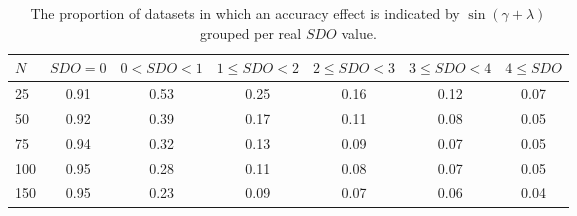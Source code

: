 \documentclass[11pt,]{article}
\begin{document}
\begin{appendices}
\begin{table}[ht]
\centering
\caption{The proportion of datasets in which an accuracy effect is indicated by $\sin(\gamma+ \lambda)$ grouped per real $SDO$ value.} 
\begin{tabular}{lcccccc}
  \noalign{\smallskip}\hline\noalign{\smallskip}
$N$ & $SDO = 0$ & $ 0 < SDO < 1$ & $1 \leq SDO < 2$ & $2 \leq SDO < 3$ &  $3 \leq SDO < 4$ & $4 \leq SDO$\\ \hline\noalign{\smallskip}
25 & 0.91 & 0.53 & 0.25 & 0.16 & 0.12 & 0.07 \\
50 & 0.92 & 0.39 & 0.17 & 0.11 & 0.08 & 0.05 \\
75 & 0.94 & 0.32 & 0.13 & 0.09 & 0.07 & 0.05 \\
100& 0.95 & 0.28 & 0.11 & 0.08 & 0.07 & 0.05 \\
150& 0.95 & 0.23 & 0.09 & 0.07 & 0.06 & 0.04 \\
   \hline
\end{tabular}
\label{TableResdetminmax}
\end{table}

\end{appendices}
\end{document}

